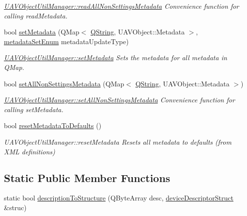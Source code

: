 \begin{DoxyCompactItemize}
\begin{DoxyCompactList}\small\item\em \hyperlink{group___u_a_v_object_util_plugin_ga1bc82b9cb256ba0c3974bab7489aba4a}{U\-A\-V\-Object\-Util\-Manager\-::read\-All\-Non\-Settings\-Metadata} Convenience function for calling read\-Metadata. \end{DoxyCompactList}\item 
bool \hyperlink{group___u_a_v_object_util_plugin_gab813cc6401727303f0787527bbd29ad1}{set\-Metadata} (Q\-Map$<$ \hyperlink{group___u_a_v_objects_plugin_gab9d252f49c333c94a72f97ce3105a32d}{Q\-String}, U\-A\-V\-Object\-::\-Metadata $>$, \hyperlink{group___u_a_v_objects_plugin_ga3f0971e47d6ebe87f97939435cd03da3}{metadata\-Set\-Enum} metadata\-Update\-Type)
\begin{DoxyCompactList}\small\item\em \hyperlink{group___u_a_v_object_util_plugin_gab813cc6401727303f0787527bbd29ad1}{U\-A\-V\-Object\-Util\-Manager\-::set\-Metadata} Sets the metadata for all metadata in Q\-Map. \end{DoxyCompactList}\item 
bool \hyperlink{group___u_a_v_object_util_plugin_gaaa6258eb268dae068887432d5efcfa6c}{set\-All\-Non\-Settings\-Metadata} (Q\-Map$<$ \hyperlink{group___u_a_v_objects_plugin_gab9d252f49c333c94a72f97ce3105a32d}{Q\-String}, U\-A\-V\-Object\-::\-Metadata $>$)
\begin{DoxyCompactList}\small\item\em \hyperlink{group___u_a_v_object_util_plugin_gaaa6258eb268dae068887432d5efcfa6c}{U\-A\-V\-Object\-Util\-Manager\-::set\-All\-Non\-Settings\-Metadata} Convenience function for calling set\-Metadata. \end{DoxyCompactList}\item 
bool \hyperlink{group___u_a_v_object_util_plugin_ga8fadd2e0c6ed3b69a1f8059d2c98054c}{reset\-Metadata\-To\-Defaults} ()
\begin{DoxyCompactList}\small\item\em U\-A\-V\-Object\-Util\-Manager\-::reset\-Metadata Resets all metadata to defaults (from X\-M\-L definitions) \end{DoxyCompactList}\end{DoxyCompactItemize}
\subsection*{Static Public Member Functions}
\begin{DoxyCompactItemize}
\item 
static bool \hyperlink{group___u_a_v_objects_plugin_ga31c6b739ad7f06472a3f3386e4bebd8a}{description\-To\-Structure} (Q\-Byte\-Array desc, \hyperlink{classdevice_descriptor_struct}{device\-Descriptor\-Struct} \&struc)
\end{DoxyCompactItemize}
